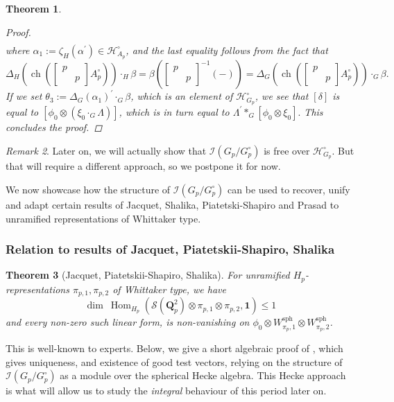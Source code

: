\documentclass{amsart}%
\theoremstyle{plain}
\newtheorem{thm}{Theorem}[subsection]
\theoremstyle{plain}
\theoremstyle{remark}
\newtheorem{rem}[thm]{Remark}
\DeclareMathOperator{\ch}{ch}
\DeclareMathOperator{\Hom}{Hom}
\begin{document}
\begin{thm}
\begin{proof}
\begin{align*}
        \end{align*}
        where $\alpha_1:=\zeta_H(\alpha^{'})\in \mathcal{H}_{A_p}^\circ$, and the last equality follows from the fact that $$\Delta_H(\ch(\left[\begin{smallmatrix}
            p & \\
            & p
        \end{smallmatrix}\right] A_p^\circ))\cdot_H \beta=\beta(\left[\begin{smallmatrix}
            p & \\
            & p
        \end{smallmatrix}\right]^{-1}(-))=\Delta_G(\ch(\left[\begin{smallmatrix}
            p & \\
            & p
        \end{smallmatrix}\right] A_p^\circ))\cdot_G \beta.$$
        If we set $\theta_3:= \Delta_G(\alpha_1)^{'}\cdot_G \beta$, which is an element of $\mathcal{H}_{G_p}^\circ$, we see that $[\delta]$ is equal to $[\phi_0\otimes (\xi_0\cdot_G \Lambda)]$, which is in turn equal to $\Lambda^{'}*_G[\phi_0\otimes \xi_0].$ This concludes the proof.
    \end{proof}
\end{thm}

\begin{rem}
    Later on, we will actually show that $\mathcal{I}(G_p/G_p^\circ)$ is free over $\mathcal{H}_{G_p}^\circ$. But that will require a different approach, so we postpone it for now. 
\end{rem}


\noindent We now showcase how the structure of $\mathcal{I}(G_p/G_p^\circ)$ can be used to recover, unify and adapt certain results of Jacquet, Shalika, Piatetski-Shapiro and Prasad to unramified representations of Whittaker type. 


\subsubsection{Relation to results of Jacquet, Piatetskii-Shapiro, Shalika}

\begin{thm}[Jacquet, Piatetskii-Shapiro, Shalika]\label{prop JSPS}
    For unramified $H_p$-representations $\pi_{p,1}, \pi_{p,2}$ of Whittaker type, we have
    $$\dim\ \Hom_{H_p}(\mathcal{S}(\mathbf{Q}_p^2)\otimes \pi_{p,1}\otimes \pi_{p,2},\mathbf{1})\leq 1$$
    and every non-zero such linear form, is non-vanishing on $\phi_0\otimes W_{\pi_p,1}^\mathrm{sph}\otimes W_{\pi_p,2}^\mathrm{sph}$.
\end{thm}
This is well-known to experts. Below, we give a short algebraic proof of , which gives uniqueness, and existence of good test vectors, relying on the structure of $\mathcal{I}(G_p/G_p^\circ)$ as a module over the spherical Hecke algebra. This Hecke approach is what will allow us to study the \textit{integral} behaviour of this period later on.
\end{document}
